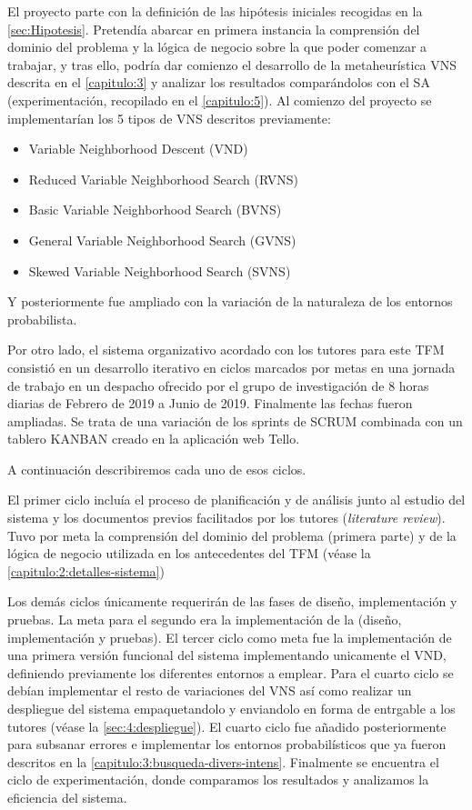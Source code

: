 El proyecto parte con la definición de las hipótesis iniciales recogidas en la \autoref{sec:Hipotesis}. 
Pretendía abarcar en primera instancia la comprensión del dominio del problema y la lógica de negocio sobre la que poder comenzar a trabajar, y tras ello, podría dar comienzo el desarrollo de la metaheurística VNS descrita en el \autoref{capitulo:3} y analizar los resultados comparándolos con el SA (experimentación, recopilado en el \autoref{capitulo:5}). Al comienzo del proyecto se implementarían los 5 tipos de VNS descritos previamente:
\begin{itemize}
	\item Variable Neighborhood Descent (VND)
	\item Reduced Variable Neighborhood Search (RVNS)
	\item Basic Variable Neighborhood Search (BVNS)
	\item General Variable Neighborhood Search (GVNS)
	\item Skewed Variable Neighborhood Search (SVNS)
\end{itemize}

Y posteriormente fue ampliado con la variación de la naturaleza de los entornos probabilista.

Por otro lado, el sistema organizativo acordado con los tutores para este TFM consistió en un desarrollo iterativo en ciclos marcados por metas en una jornada de trabajo en un despacho ofrecido por el grupo de investigación de 8 horas diarias de Febrero de 2019 a Junio de 2019. Finalmente las fechas fueron ampliadas. Se trata de una variación de los sprints de SCRUM combinada con un tablero KANBAN creado en la aplicación web Tello. 

A continuación describiremos cada uno de esos ciclos.

El primer ciclo incluía el proceso de planificación y de análisis junto al estudio del sistema y los documentos previos facilitados por los tutores (\textit{literature review}). Tuvo por meta la comprensión del dominio del problema (primera parte) y de la lógica de negocio utilizada en los antecedentes del TFM (véase la \autoref{capitulo:2:detalles-sistema})

Los demás ciclos únicamente requerirán de las fases de diseño, implementación y pruebas. La meta para el segundo era la implementación de la \faseuno{} (diseño, implementación y pruebas). El tercer ciclo como meta fue la implementación de una primera versión funcional del sistema implementando unicamente el VND, definiendo previamente los diferentes entornos a emplear. Para el cuarto ciclo se debían implementar el resto de variaciones del VNS así como realizar un despliegue del sistema empaquetandolo y enviandolo en forma de entrgable a los tutores (véase la \autoref{sec:4:despliegue}). El cuarto ciclo fue añadido posteriormente para subsanar errores e implementar los entornos probabilísticos que ya fueron descritos en la \autoref{capitulo:3:busqueda-divers-intens}. Finalmente se encuentra el ciclo de experimentación, donde comparamos los resultados y analizamos la eficiencia del sistema.

